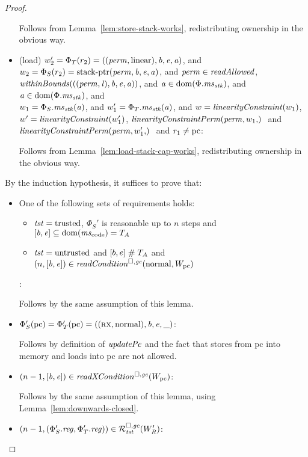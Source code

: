 \begin{proof}
\begin{itemize}
        Follows from Lemma~\ref{lem:store-stack-works}, redistributing ownership in the obvious way.

  \item (load) $ w_2' = \Phi_T(r_2) =
        ((\mathit{perm},\mathrm{linear}),\mathit{b},\mathit{e},\mathit{a})$, and $w_2 = \Phi_S(r_2) =
        \mathrm{stack\text{-}ptr}(\mathit{perm},\mathit{b},\mathit{e},\mathit{a})$, and $\perm \in \readAllowed{}$,
        $\withinBounds{((\perm,\lin),\baddr,\eaddr,\aaddr)}$, and $\mathit{a} \in
        \mathrm{dom}(\Phi.\mathit{ms}_{\mathit{stk}})$, and $\mathit{a} \in \mathrm{dom}(\Phi.\mathit{ms}_{\mathit{stk}})$, and\\
        $w_1 = \Phi_S.\mathit{ms}_{\mathit{stk}}(\mathit{a})$, and $w_1' = \Phi_T.\mathit{ms}_{\mathit{stk}}(\mathit{a})$, and $w = \linCons{w_1}$, $w' = \linCons{w_1'}$, $\linConsPerm{\perm,w_1}$ and $\linConsPerm{\perm,w_1'}$ and $r_1 \neq \mathrm{pc}$:

    Follows from Lemma~\ref{lem:load-stack-cap-works}, redistributing ownership in the obvious way.

  \end{itemize}

  By the induction hypothesis, it suffices to prove that:
  \begin{itemize}
  \item One of the following sets of requirements holds:
    \begin{itemize}
    \item $\mathit{tst} = \mathrm{trusted}$, $\Phi_S'$ is reasonable up to $n$ steps and $[\baddr,\eaddr] \subseteq \dom(\mscode) = \ta$
    \item $\mathit{tst} = \mathrm{untrusted}$ and $[b,e] \mathrel{\#} T_{A}$ and $\npair{[\baddr,\eaddr]} \in \readCond{\normal,W_\pcreg}$
    \end{itemize}:

    Follows by the same assumption of this lemma.

  \item $\Phi_S'(\mathrm{pc}) = \Phi_T'(\mathrm{pc}) = ((\textsc{rx},\mathrm{normal}),\mathit{b},\mathit{e},\_)$:

    Follows by definition of $\updPcAddr{}$ and the fact that stores from pc into memory and loads into pc are not allowed.

  \item $\npair[n-1]{[\baddr,\eaddr]} \in \xReadCond{W_\pcreg}$:

    Follows by the same assumption of this lemma, using Lemma~\ref{lem:downwards-closed}.

  \item $\npair[n-1]{(\Phi_S'.\reg,\Phi_T'.\reg)} \in \lrrg{\trust}(W_R')$:


\end{itemize}
\end{proof}
